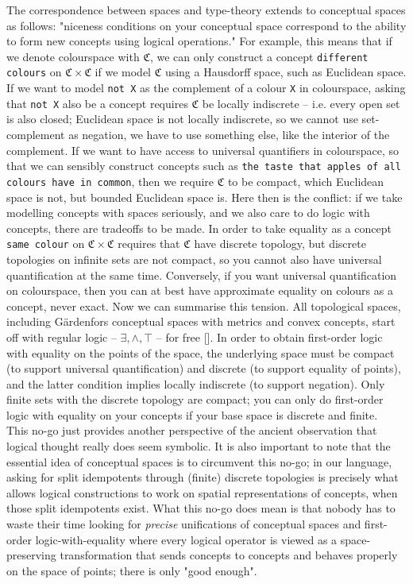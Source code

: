 The correspondence between spaces and type-theory extends to conceptual spaces as follows: "niceness conditions on your conceptual space correspond to the ability to form new concepts using logical operations." For example, this means that if we denote colourspace with $\mathfrak{C}$, we can only construct a concept \texttt{different colours} on $\mathfrak{C} \times \mathfrak{C}$ if we model $\mathfrak{C}$ using a Hausdorff space, such as Euclidean space. If we want to model \texttt{not X} as the complement of a colour \texttt{X} in colourspace, asking that \texttt{not X} also be a concept requires $\mathfrak{C}$ be locally indiscrete -- i.e. every open set is also closed; Euclidean space is not locally indiscrete, so we cannot use set-complement as negation, we have to use something else, like the interior of the complement. If we want to have access to universal quantifiers in colourspace, so that we can sensibly construct concepts such as \texttt{the taste that apples of all colours have in common}, then we require $\mathfrak{C}$ to be compact, which Euclidean space is not, but bounded Euclidean space is. Here then is the conflict: if we take modelling concepts with spaces seriously, and we also care to do logic with concepts, there are tradeoffs to be made. In order to take equality as a concept \texttt{same colour} on $\mathfrak{C} \times \mathfrak{C}$ requires that $\mathfrak{C}$ have discrete topology, but discrete topologies on infinite sets are not compact, so you cannot also have universal quantification at the same time. Conversely, if you want universal quantification on colourspace, then you can at best have approximate equality on colours as a concept, never exact. Now we can summarise this tension. All topological spaces, including G\"{a}rdenfors conceptual spaces with metrics and convex concepts, start off with regular logic -- $\exists, \wedge, \top$ -- for free []. In order to obtain first-order logic with equality on the points of the space, the underlying space must be compact (to support universal quantification) and discrete (to support equality of points), and the latter condition implies locally indiscrete (to support negation). Only finite sets with the discrete topology are compact; you can only do first-order logic with equality on your concepts if your base space is discrete and finite.\\

This no-go just provides another perspective of the ancient observation that logical thought really does seem symbolic. It is also important to note that the essential idea of conceptual spaces is to circumvent this no-go; in our language, asking for split idempotents through (finite) discrete topologies is precisely what allows logical constructions to work on spatial representations of concepts, when those split idempotents exist. What this no-go does mean is that nobody has to waste their time looking for \emph{precise} unifications of conceptual spaces and first-order logic-with-equality where every logical operator is viewed as a space-preserving transformation that sends concepts to concepts and behaves properly on the space of points; there is only "good enough".

